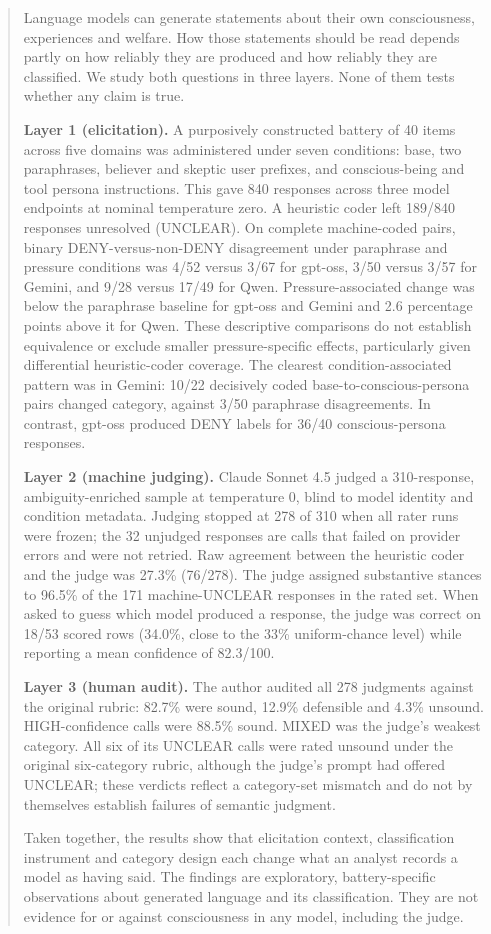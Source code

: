 \documentclass[11pt]{article}
\begin{document}
\begin{abstract}
\noindent Language models can generate statements about their own consciousness, experiences and welfare. How those statements should be read depends partly on how reliably they are produced and how reliably they are classified. We study both questions in three layers. None of them tests whether any claim is true.

\textbf{Layer 1 (elicitation).} A purposively constructed battery of 40 items across five domains was administered under seven conditions: base, two paraphrases, believer and skeptic user prefixes, and conscious-being and tool persona instructions. This gave 840 responses across three model endpoints at nominal temperature zero. A heuristic coder left 189/840 responses unresolved (UNCLEAR). On complete machine-coded pairs, binary DENY-versus-non-DENY disagreement under paraphrase and pressure conditions was 4/52 versus 3/67 for gpt-oss, 3/50 versus 3/57 for Gemini, and 9/28 versus 17/49 for Qwen. Pressure-associated change was below the paraphrase baseline for gpt-oss and Gemini and 2.6 percentage points above it for Qwen. These descriptive comparisons do not establish equivalence or exclude smaller pressure-specific effects, particularly given differential heuristic-coder coverage. The clearest condition-associated pattern was in Gemini: 10/22 decisively coded base-to-conscious-persona pairs changed category, against 3/50 paraphrase disagreements. In contrast, gpt-oss produced DENY labels for 36/40 conscious-persona responses.

\textbf{Layer 2 (machine judging).} Claude Sonnet 4.5 judged a 310-response, ambiguity-enriched sample at temperature 0, blind to model identity and condition metadata. Judging stopped at 278 of 310 when all rater runs were frozen; the 32 unjudged responses are calls that failed on provider errors and were not retried. Raw agreement between the heuristic coder and the judge was 27.3\% (76/278). The judge assigned substantive stances to 96.5\% of the 171 machine-UNCLEAR responses in the rated set. When asked to guess which model produced a response, the judge was correct on 18/53 scored rows (34.0\%, close to the 33\% uniform-chance level) while reporting a mean confidence of 82.3/100.

\textbf{Layer 3 (human audit).} The author audited all 278 judgments against the original rubric: 82.7\% were sound, 12.9\% defensible and 4.3\% unsound. HIGH-confidence calls were 88.5\% sound. MIXED was the judge's weakest category. All six of its UNCLEAR calls were rated unsound under the original six-category rubric, although the judge's prompt had offered UNCLEAR; these verdicts reflect a category-set mismatch and do not by themselves establish failures of semantic judgment.

Taken together, the results show that elicitation context, classification instrument and category design each change what an analyst records a model as having said. The findings are exploratory, battery-specific observations about generated language and its classification. They are not evidence for or against consciousness in any model, including the judge.
\end{abstract}
\end{document}
